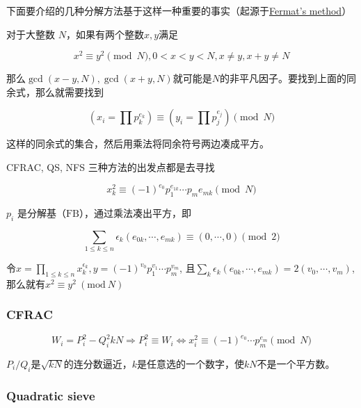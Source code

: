 \documentclass{article}
\begin{document}
下面要介绍的几种分解方法基于这样一种重要的事实（起源于\href{https://en.wikipedia.org/wiki/Fermat%27s_factorization_method}{\color{blue}Fermat's method}）

对于大整数 $N$，如果有两个整数$x,y$满足

\begin{equation}
    x^2\equiv y^2\pmod{N}, 0 < x < y < N, x\neq y, x+y\neq N
\end{equation}

那么$\gcd(x-y,N), \gcd(x+y,N)$就可能是$N$的非平凡因子。要找到上面的同余式，那么就需要找到

\begin{equation}
    \left(x_i=\prod{p_k^{e_k}}\right)\equiv \left(y_i=\prod{p_j^{e_j}}\right)\pmod{N}
\end{equation}

这样的同余式的集合，然后用乘法将同余符号两边凑成平方。

CFRAC, QS, NFS 三种方法的出发点都是去寻找

\begin{equation}
    x_k^2\equiv (-1)^{e_0}p_1^{e_{1k}}\cdots p_m{e_{mk}}\pmod{N}
\end{equation}

$p_i$ 是分解基（$\text{FB}$），通过乘法凑出平方，即

\begin{equation}
    \sum_{1\leq k\leq n}\epsilon_k(e_{0k},\cdots,e_{mk})\equiv (0,\cdots, 0)\pmod{2}
\end{equation}

令$x=\prod_{1\leq k\leq n}x_{k}^{\epsilon_{k}}, y=(-1)^{v_0}p_1^{v_1}\cdots p_m^{v_m}$, 且$\sum_{k}\epsilon_k(e_{0k}, \cdots, e_{mk})=2(v_0,\cdots,v_m)$, 那么就有$x^2\equiv y^2~(\mathrm{mod}~N)$

\subsubsection{CFRAC}


\begin{equation}
    W_i=P_i^2-Q_i^2kN\Rightarrow P_i^2\equiv W_i \Leftrightarrow x_i^2\equiv (-1)^{e_0}\cdots p_m^{e_m}\pmod{N}
\end{equation}

$P_i/Q_i$是$\sqrt{kN}$的连分数逼近，$k$是任意选的一个数字，使$kN$不是一个平方数。


\subsubsection{Quadratic sieve}
\end{document}
